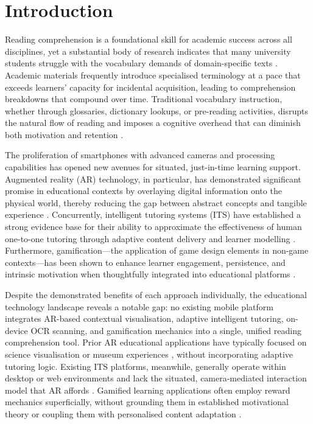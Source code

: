 
\section{Introduction}
\label{sec:introduction}

Reading comprehension is a foundational skill for academic success across all disciplines, yet a substantial body of research indicates that many university students struggle with the vocabulary demands of domain-specific texts \cite{vanlehn2011, bloom1984}. Academic materials frequently introduce specialised terminology at a pace that exceeds learners' capacity for incidental acquisition, leading to comprehension breakdowns that compound over time. Traditional vocabulary instruction, whether through glossaries, dictionary lookups, or pre-reading activities, disrupts the natural flow of reading and imposes a cognitive overhead that can diminish both motivation and retention \cite{anderson2001}.

The proliferation of smartphones with advanced cameras and processing capabilities has opened new avenues for situated, just-in-time learning support. Augmented reality (AR) technology, in particular, has demonstrated significant promise in educational contexts by overlaying digital information onto the physical world, thereby reducing the gap between abstract concepts and tangible experience \cite{azuma1997, wu2013, akccayir2017}. Concurrently, intelligent tutoring systems (ITS) have established a strong evidence base for their ability to approximate the effectiveness of human one-to-one tutoring through adaptive content delivery and learner modelling \cite{kulik2016, corbett1994}. Furthermore, gamification---the application of game design elements in non-game contexts---has been shown to enhance learner engagement, persistence, and intrinsic motivation when thoughtfully integrated into educational platforms \cite{deterding2011}.

Despite the demonstrated benefits of each approach individually, the educational technology landscape reveals a notable gap: no existing mobile platform integrates AR-based contextual visualisation, adaptive intelligent tutoring, on-device OCR scanning, and gamification mechanics into a single, unified reading comprehension tool. Prior AR educational applications have typically focused on science visualisation \cite{ibanezmolina2018} or museum experiences \cite{bacca2014}, without incorporating adaptive tutoring logic. Existing ITS platforms, meanwhile, generally operate within desktop or web environments and lack the situated, camera-mediated interaction model that AR affords \cite{du2020}. Gamified learning applications often employ reward mechanics superficially, without grounding them in established motivational theory or coupling them with personalised content adaptation \cite{ryan2000}.

